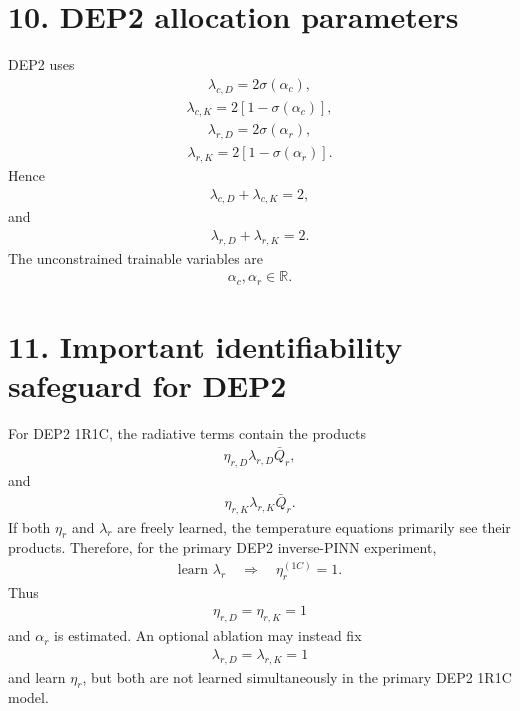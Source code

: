 \documentclass[11pt]{article}
\begin{document}
\section*{10. DEP2 allocation parameters}
DEP2 uses
\begin{align}
\boxed{\lambda_{c,D}=2\sigma(\alpha_c),}
\tag{P2.40}
\end{align}
\begin{align}
\boxed{\lambda_{c,K}=2[1-\sigma(\alpha_c)],}
\tag{P2.41}
\end{align}
\begin{align}
\boxed{\lambda_{r,D}=2\sigma(\alpha_r),}
\tag{P2.42}
\end{align}
\begin{align}
\boxed{\lambda_{r,K}=2[1-\sigma(\alpha_r)].}
\tag{P2.43}
\end{align}
Hence
\begin{align}
\boxed{\lambda_{c,D}+\lambda_{c,K}=2,}
\tag{P2.44}
\end{align}
and
\begin{align}
\boxed{\lambda_{r,D}+\lambda_{r,K}=2.}
\tag{P2.45}
\end{align}
The unconstrained trainable variables are
\begin{align}
\boxed{\alpha_c,\alpha_r\in\mathbb R.}
\tag{P2.46}
\end{align}

\section*{11. Important identifiability safeguard for DEP2}
For DEP2 1R1C, the radiative terms contain the products
\begin{align}
\eta_{r,D}\lambda_{r,D}\bar Q_r,
\end{align}
and
\begin{align}
\eta_{r,K}\lambda_{r,K}\bar Q_r.
\end{align}
If both \(\eta_r\) and \(\lambda_r\) are freely learned, the temperature equations primarily see their products. Therefore, for the primary DEP2 inverse-PINN experiment,
\begin{align}
\boxed{\text{learn }\lambda_r\quad\Longrightarrow\quad\eta_r^{(1C)}=1.}
\tag{P2.47}
\end{align}
Thus
\begin{align}
\boxed{\eta_{r,D}=\eta_{r,K}=1}
\tag{P2.48}
\end{align}
and \(\alpha_r\) is estimated. An optional ablation may instead fix
\begin{align}
\lambda_{r,D}=\lambda_{r,K}=1
\end{align}
and learn \(\eta_r\), but both are not learned simultaneously in the primary DEP2 1R1C model.
\end{document}
